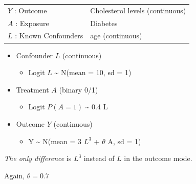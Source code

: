 \documentclass[
]{book}
\providecommand{\tightlist}{%
  \setlength{\itemsep}{0pt}\setlength{\parskip}{0pt}}
\begin{document}
\begin{longtable}[]{@{}ll@{}}
\toprule
\endhead
\(Y\) : Outcome & Cholesterol levels (continuous)\tabularnewline
\(A\) : Exposure & Diabetes\tabularnewline
\(L\) : Known Confounders & age (continuous)\tabularnewline
\bottomrule
\end{longtable}

\begin{itemize}
\tightlist
\item
  Confounder \(L\) (continuous)

  \begin{itemize}
  \tightlist
  \item
    Logit \(L\) \textasciitilde{} N(mean = 10, sd = 1)
  \end{itemize}
\item
  Treatment \(A\) (binary 0/1)

  \begin{itemize}
  \tightlist
  \item
    Logit \(P(A = 1)\) \textasciitilde{} 0.4 L
  \end{itemize}
\item
  Outcome \(Y\) (continuous)

  \begin{itemize}
  \tightlist
  \item
    Y \textasciitilde{} N(mean = 3 \(L^3\) + \(\theta\) A, sd = 1)
  \end{itemize}
\end{itemize}

\emph{The only difference} is \(L^3\) instead of \(L\) in the outcome mode.

Again, \(\theta = 0.7\)
\end{document}

